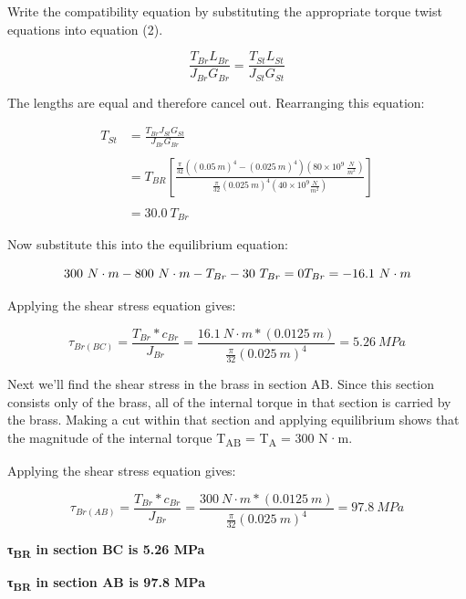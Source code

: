 \documentclass[
  letterpaper,
  DIV=11,
  numbers=noendperiod]{scrreprt}
\theoremstyle{definition}
\theoremstyle{remark}
\begin{document}
\begin{tcolorbox}
\begin{tcolorbox}
Write the compatibility equation by substituting the appropriate torque
twist equations into equation (2).

\[
\frac{T_{Br}L_{Br}}{J_{Br}G_{Br}}=\frac{T_{St}L_{St}}{J_{St}G_{St}}
\]

The lengths are equal and therefore cancel out. Rearranging this
equation:

\[
\begin{aligned}
T_{St}&=\frac{T_{Br}J_{St}G_{St}}{J_{Br}G_{Br}} \\
\\
&=T_{BR}\left[\frac{\frac{\pi}{32}\left((0.05{~m})^4-(0.025{~m})^4\right)\left(80 \times 10^9~\frac{{N}}{{m}^2}\right)}{\frac{\pi}{32}(0.025{~m})^4\left(40 \times 10^9 \frac{{N}}{{m}^2}\right)}\right] \\
\\
&=30.0~T_{Br}
\end{aligned}
\]

Now substitute this into the equilibrium equation:

\[
300{~N}\cdot{m}-800{~N}\cdot{m}-T_{Br}-30~T_{Br}=0 \\
T_{Br}=-16.1 {~N}\cdot{m}
\]

Applying the shear stress equation gives:

\[
\tau_{Br(B C)}=\frac{T_{Br}*c_{Br}}{J_{Br}}=\frac{16.1{~N}\cdot{m}*(0.0125{~m})}{\frac{\pi}{32}(0.025{~m})^4}=5.26{~MPa}
\]

Next we'll find the shear stress in the brass in section AB. Since this
section consists only of the brass, all of the internal torque in that
section is carried by the brass. Making a cut within that section and
applying equilibrium shows that the magnitude of the internal torque
T\textsubscript{AB} = T\textsubscript{A} = 300 N·m.

Applying the shear stress equation gives:

\[
\tau_{Br(AB)}=\frac{T_{Br}*c_{Br}}{J_{Br}}=\frac{300{~N}\cdot{m}*(0.0125{~m})}{\frac{\pi}{32}(0.025{~m})^4}=97.8{~MPa}
\]

\textbf{τ\textsubscript{BR} in section BC is 5.26 MPa}

\textbf{τ\textsubscript{BR} in section AB is 97.8 MPa}

\end{tcolorbox}

\end{tcolorbox}
\end{document}
